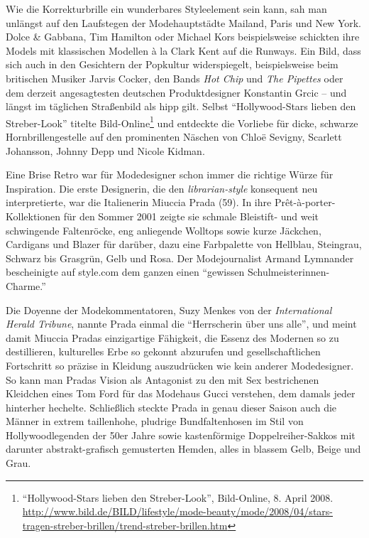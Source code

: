 \documentclass[output=paper]{langscibook}
\begin{document}
Wie die Korrekturbrille ein wunderbares Styleelement sein kann, sah man
unlängst auf den Laufstegen der Modehauptstädte Mailand, Paris und New
York. Dolce \& Gabbana, Tim Hamilton oder Michael Kors beispielsweise
schickten ihre Models mit klassischen Modellen à la Clark Kent auf die
Runways. Ein Bild, dass sich auch in den Gesichtern der Popkultur
widerspiegelt, beispielsweise beim britischen Musiker Jarvis Cocker, den
Bands \emph{Hot Chip} und \emph{The Pipettes} oder dem derzeit
angesagtesten deutschen Produktdesigner Konstantin Grcic -- und längst
im täglichen Straßenbild als hipp gilt. Selbst ``Hollywood-Stars lieben
den Streber-Look'' titelte Bild-Online\footnote{``Hollywood-Stars lieben
  den Streber-Look'', Bild-Online, 8. April 2008.
  \url{http://www.bild.de/BILD/lifestyle/mode-beauty/mode/2008/04/stars-tragen-streber-brillen/trend-streber-brillen.htm}}
und entdeckte die Vorliebe für dicke, schwarze Hornbrillengestelle auf
den prominenten Näschen von Chloë Sevigny, Scarlett Johansson, Johnny
Depp und Nicole Kidman.

Eine Brise Retro war für Modedesigner schon immer die richtige Würze für
Inspiration. Die erste Designerin, die den \emph{librarian-style}
konsequent neu interpretierte, war die Italienerin Miuccia Prada (59).
In ihre Prêt-à-porter-Kollektionen für den Sommer 2001 zeigte sie
schmale Bleistift- und weit schwingende Faltenröcke, eng anliegende
Wolltops sowie kurze Jäckchen, Cardigans und Blazer für darüber, dazu
eine Farbpalette von Hellblau, Steingrau, Schwarz bis Grasgrün, Gelb und
Rosa. Der Modejournalist Armand Lymnander bescheinigte auf style.com dem
ganzen einen ``gewissen Schulmeisterinnen-Charme.''

Die Doyenne der Modekommentatoren, Suzy Menkes von der
\emph{International Herald Tribune}, nannte Prada einmal die
``Herrscherin über uns alle'', und meint damit Miuccia Pradas
einzigartige Fähigkeit, die Essenz des Modernen so zu destillieren,
kulturelles Erbe so gekonnt abzurufen und gesellschaftlichen Fortschritt
so präzise in Kleidung auszudrücken wie kein anderer Modedesigner. So
kann man Pradas Vision als Antagonist zu den mit Sex bestrichenen
Kleidchen eines Tom Ford für das Modehaus Gucci verstehen, dem damals
jeder hinterher hechelte. Schließlich steckte Prada in genau dieser
Saison auch die Männer in extrem taillenhohe, pludrige Bundfaltenhosen
im Stil von Hollywoodlegenden der 50er Jahre sowie kastenförmige
Doppelreiher-Sakkos mit darunter abstrakt-grafisch gemusterten Hemden,
alles in blassem Gelb, Beige und Grau.
\end{document}
